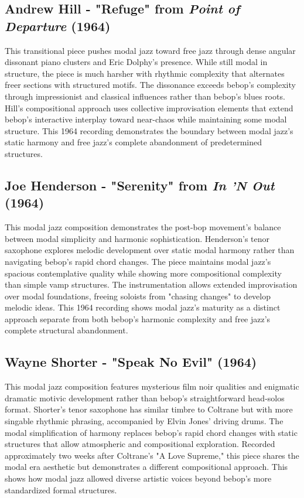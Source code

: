 \documentclass[11pt]{article}
\begin{document}
\subsection*{Andrew Hill - "Refuge" from \emph{Point of Departure} (1964)}
This transitional piece pushes modal jazz toward free jazz through dense angular dissonant piano clusters and Eric Dolphy's presence. While still modal in structure, the piece is much harsher with rhythmic complexity that alternates freer sections with structured motifs. The dissonance exceeds bebop's complexity through impressionist and classical influences rather than bebop's blues roots. Hill's compositional approach uses collective improvisation elements that extend bebop's interactive interplay toward near-chaos while maintaining some modal structure. This 1964 recording demonstrates the boundary between modal jazz's static harmony and free jazz's complete abandonment of predetermined structures.

\subsection*{Joe Henderson - "Serenity" from \emph{In 'N Out} (1964)}
This modal jazz composition demonstrates the post-bop movement's balance between modal simplicity and harmonic sophistication. Henderson's tenor saxophone explores melodic development over static modal harmony rather than navigating bebop's rapid chord changes. The piece maintains modal jazz's spacious contemplative quality while showing more compositional complexity than simple vamp structures. The instrumentation allows extended improvisation over modal foundations, freeing soloists from "chasing changes" to develop melodic ideas. This 1964 recording shows modal jazz's maturity as a distinct approach separate from both bebop's harmonic complexity and free jazz's complete structural abandonment.

\subsection*{Wayne Shorter - "Speak No Evil" (1964)}
This modal jazz composition features mysterious film noir qualities and enigmatic dramatic motivic development rather than bebop's straightforward head-solos format. Shorter's tenor saxophone has similar timbre to Coltrane but with more singable rhythmic phrasing, accompanied by Elvin Jones' driving drums. The modal simplification of harmony replaces bebop's rapid chord changes with static structures that allow atmospheric and compositional exploration. Recorded approximately two weeks after Coltrane's "A Love Supreme," this piece shares the modal era aesthetic but demonstrates a different compositional approach. This shows how modal jazz allowed diverse artistic voices beyond bebop's more standardized formal structures.
\end{document}
